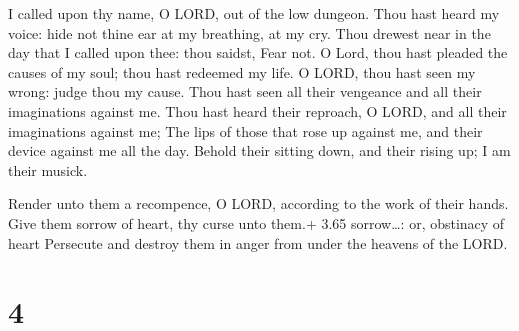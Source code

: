  I called upon thy name, O LORD, out of the low dungeon.
 Thou hast heard my voice: hide not thine ear at my
breathing, at my cry.  Thou drewest near in the day that I
called upon thee: thou saidst, Fear not.  O Lord, thou hast
pleaded the causes of my soul; thou hast redeemed my life. 
O LORD, thou hast seen my wrong: judge thou my cause.  Thou
hast seen all their vengeance and all their imaginations against me.
 Thou hast heard their reproach, O LORD, and all their
imaginations against me;  The lips of those that rose up
against me, and their device against me all the day. 
Behold their sitting down, and their rising up; I am their musick.

 Render unto them a recompence, O LORD, according to the
work of their hands.  Give them sorrow of heart, thy curse
unto them.+ 3.65 sorrow\ldots: or, obstinacy of heart 
Persecute and destroy them in anger from under the heavens of the LORD.

\hypertarget{section-3}{%
\section{4}\label{section-3}}

